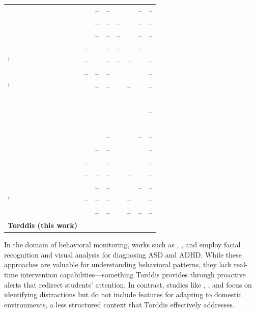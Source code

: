 \begin{longtable}{@{}>{\raggedright\arraybackslash}p{5.2cm}ccccccc@{}}
	\citet{Muthulingam2025Inclusive} & \checkmark & -- & -- & \checkmark & \checkmark & -- & -- \\
	\citet{Mohamed2025EmotionAware} & \checkmark & -- & -- & -- & \checkmark & -- & -- \\
	\citet{Shiny2025Neurolearn} & \checkmark & -- & -- & -- & \checkmark & -- & -- \\
	\citet{Sandhya2025LearningBased} & -- & \checkmark & -- & -- & \checkmark & -- & \checkmark \\
	\citet{Huang2025Facial}$^{\dagger}$ & -- & \checkmark & -- & -- & -- & \checkmark & -- \\
	\citet{Wang2025IotEnabled} & -- & -- & -- & \checkmark & \checkmark & \checkmark & -- \\
	\citet{Xu2025IotBased}$^{\dagger}$ & \checkmark & -- & -- & \checkmark & -- & \checkmark & -- \\
	\citet{Baheti2025Languages} & -- & -- & -- & \checkmark & \checkmark & \checkmark & -- \\
	\citet{Cao2026Yolov8Based} & \checkmark & \checkmark & \checkmark & \checkmark & \checkmark & \checkmark & -- \\
	\citet{Guo2026RealTime} & -- & -- & -- & \checkmark & \checkmark & \checkmark & -- \\
	\citet{D2026Intellimentor} & \checkmark & \checkmark & -- & \checkmark & \checkmark & -- & -- \\
	\citet{Huong2026Personalized} & \checkmark & -- & -- & \checkmark & \checkmark & \checkmark & -- \\
	\citet{Thaseen2026Iot} & -- & \checkmark & -- & \checkmark & \checkmark & \checkmark & -- \\
	\citet{Waheed2026Iot} & -- & -- & -- & \checkmark & -- & \checkmark & -- \\
	\citet{Ayyadurai2026Efficient} & \checkmark & -- & -- & \checkmark & \checkmark & -- & -- \\
	\citet{Chen2026Iot}$^{\dagger}$ & -- & -- & -- & \checkmark & -- & \checkmark & -- \\
	\citet{He2026Multimodal} & \checkmark & -- & -- & \checkmark & -- & -- & -- \\
	\midrule
	\textbf{Torddis (this work)} & \checkmark & \checkmark & \checkmark & \checkmark & \checkmark & \checkmark & \checkmark \\
	\bottomrule
\end{longtable}

In the domain of behavioral monitoring, works such as \cite{Akter2021}, \cite{Pelc2006}, and \cite{Albrecht2014} employ facial recognition and visual analysis for diagnosing ASD and ADHD. While these approaches are valuable for understanding behavioral patterns, they lack real-time intervention capabilities—something Torddis provides through proactive alerts that redirect students' attention. In contrast, studies like \cite{Campbell2015Using}, \cite{Ucar2022Recognizing}, and \cite{Argel2023Intellitell} focus on identifying distractions but do not include features for adapting to domestic environments, a less structured context that Torddis effectively addresses.

